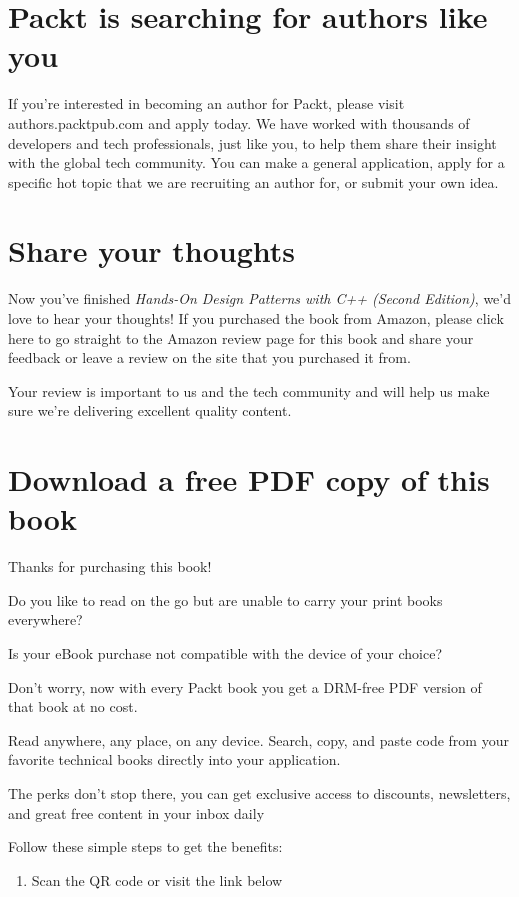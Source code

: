 \section{Packt is searching for authors like you}

If you're interested in becoming an author for Packt, please visit authors.packtpub.com and apply today. We have worked with thousands of developers and tech professionals, just like you, to help them share their insight with the global tech community. You can make a general application, apply for a specific hot topic that we are recruiting an author for, or submit your own idea.

\section{Share your thoughts}

Now you've finished \emph{Hands-On Design Patterns with C++ (Second Edition)}, we'd love to hear your thoughts! If you purchased the book from Amazon, please click here to go straight to the Amazon review page for this book and share your feedback or leave a review on the site that you purchased it from.

Your review is important to us and the tech community and will help us make sure we're delivering excellent quality content.

\section{Download a free PDF copy of this book}

Thanks for purchasing this book!

Do you like to read on the go but are unable to carry your print books everywhere?

Is your eBook purchase not compatible with the device of your choice?

Don't worry, now with every Packt book you get a DRM-free PDF version of that book at no cost.

Read anywhere, any place, on any device. Search, copy, and paste code from your favorite technical books directly into your application.

The perks don't stop there, you can get exclusive access to discounts, newsletters, and great free content in your inbox daily

Follow these simple steps to get the benefits:

\begin{enumerate}
\item
  Scan the QR code or visit the link below
\end{enumerate}

